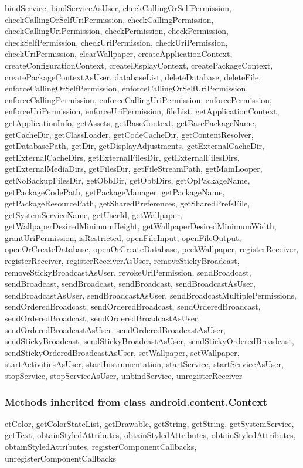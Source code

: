 bindService, bindServiceAsUser, checkCallingOrSelfPermission, checkCallingOrSelfUriPermission, checkCallingPermission, checkCallingUriPermission, checkPermission, checkPermission, checkSelfPermission, checkUriPermission, checkUriPermission, checkUriPermission, clearWallpaper, createApplicationContext, createConfigurationContext, createDisplayContext, createPackageContext, createPackageContextAsUser, databaseList, deleteDatabase, deleteFile, enforceCallingOrSelfPermission, enforceCallingOrSelfUriPermission, enforceCallingPermission, enforceCallingUriPermission, enforcePermission, enforceUriPermission, enforceUriPermission, fileList, getApplicationContext, getApplicationInfo, getAssets, getBaseContext, getBasePackageName, getCacheDir, getClassLoader, getCodeCacheDir, getContentResolver, getDatabasePath, getDir, getDisplayAdjustments, getExternalCacheDir, getExternalCacheDirs, getExternalFilesDir, getExternalFilesDirs, getExternalMediaDirs, getFilesDir, getFileStreamPath, getMainLooper, getNoBackupFilesDir, getObbDir, getObbDirs, getOpPackageName, getPackageCodePath, getPackageManager, getPackageName, getPackageResourcePath, getSharedPreferences, getSharedPrefsFile, getSystemServiceName, getUserId, getWallpaper, getWallpaperDesiredMinimumHeight, getWallpaperDesiredMinimumWidth, grantUriPermission, isRestricted, openFileInput, openFileOutput, openOrCreateDatabase, openOrCreateDatabase, peekWallpaper, registerReceiver, registerReceiver, registerReceiverAsUser, removeStickyBroadcast, removeStickyBroadcastAsUser, revokeUriPermission, sendBroadcast, sendBroadcast, sendBroadcast, sendBroadcast, sendBroadcastAsUser, sendBroadcastAsUser, sendBroadcastAsUser, sendBroadcastMultiplePermissions, sendOrderedBroadcast, sendOrderedBroadcast, sendOrderedBroadcast, sendOrderedBroadcast, sendOrderedBroadcastAsUser, sendOrderedBroadcastAsUser, sendOrderedBroadcastAsUser, sendStickyBroadcast, sendStickyBroadcastAsUser, sendStickyOrderedBroadcast, sendStickyOrderedBroadcastAsUser, setWallpaper, setWallpaper, startActivitiesAsUser, startInstrumentation, startService, startServiceAsUser, stopService, stopServiceAsUser, unbindService, unregisterReceiver\\

\subsubsection{Methods inherited from class android.content.Context}

etColor, getColorStateList, getDrawable, getString, getString, getSystemService, getText, obtainStyledAttributes, obtainStyledAttributes, obtainStyledAttributes, obtainStyledAttributes, registerComponentCallbacks, unregisterComponentCallbacks\\

